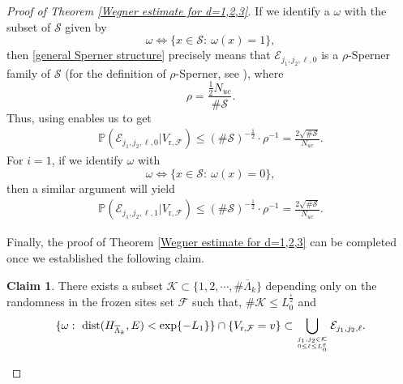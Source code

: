 \documentclass[11pt,reqno,UTF8,twoside]{amsart}
\newcommand{\barLambda}{\overline{\Lambda}}
\renewcommand{\P}{\mathbb{P}}
\newcommand{\mcE}{\mathcal{E}}
\newcommand{\mcF}{\mathcal{F}}
\newcommand{\mcS}{\mathcal{S}}
\newcommand{\mcK}{\mathcal{K}}
\newcommand{\dist}{{\rm dist}}
\theoremstyle{definition}
\newtheorem{claim}[thm]{\bf Claim}
\numberwithin{equation}{section}
\begin{document}
\begin{proof}[Proof of Theorem \ref{Wegner estimate for d=1,2,3}]
If we identify a $\omega$ with the subset of $\mcS$ given by
\[\omega\Leftrightarrow \{x\in \mcS:\ \omega(x)=1 \},\]
then \eqref{general Sperner structure} precisely means that $\mcE_{j_1,j_2,\ell,0}$ is a $\rho$-Sperner family of $\mcS$ (for the definition of $\rho$-Sperner, see \cite[Definition 4.1]{DS20}), where
\begin{equation}\label{Sperner rho final}
  \rho= \frac{\frac{1}{2} N_{uc}}{\# \mcS }.
\end{equation}\label{Sperner estimate for i=0}
Thus, using \cite[Theorem 4.2]{DS20}   enables  us to get  
\begin{align}
  \P(\mcE_{j_1,j_2,\ell,0}| V_{\text{r},\mcF} ) \leq \left(\#\mcS\right)^{-\frac{1}{2}} \cdot \rho^{-1}=\frac{2\sqrt{\# \mcS}}{N_{uc}}.
\end{align}
For $i=1$, if we identify $\omega$ with 
\[\omega\Leftrightarrow \{x\in \mcS:\ \omega(x)=0 \},\]
then a similar  argument will yield  
\begin{align}\label{Sperner estimate for i=1}
  \P(\mcE_{j_1,j_2,\ell,1}| V_{\text{r},\mcF} ) \leq \left(\#\mcS\right)^{-\frac{1}{2}} \cdot \rho^{-1}=\frac{2\sqrt{\# \mcS}}{N_{uc}}.
\end{align}

Finally, the proof of Theorem \ref{Wegner estimate for d=1,2,3} can  be completed once we established  the following claim.

\begin{claim}\label{Wegner set inclusion}
  There exists  a subset $\mcK\subset \{1,2,\cdots,\# \barLambda_k\}$ depending only on the randomness in the frozen sites  set $\mcF$ such that,  $\# \mcK\leq L_0^{\frac{\varepsilon}{2}}$ and 
  \[\{\omega:\  \dist(H_{\barLambda_k},E)< \exp\{-L_1\}\} \cap \{V_{\text{r},\mcF}=v \}\subset \bigcup_{j_1,j_2\in \mcK \atop 0\leq \ell \leq L_0^{\varepsilon} }\mcE_{j_1,j_2,\ell}.\]
\end{claim}


\end{proof}
\end{document}
